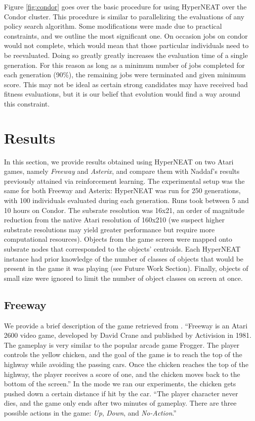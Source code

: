 \documentclass{acm_proc_article-sp}
\begin{document}
Figure \ref{fig:condor} goes over the basic procedure for using HyperNEAT over the Condor cluster. This procedure is similar to parallelizing the evaluations of any policy search algorithm. Some modifications were made due to practical constraints, and we outline the most significant one. On occasion jobs on condor would not complete, which would mean that those particular individuals need to be reevaluated. Doing so greatly greatly increases the evaluation time of a single generation. For this reason as long as a minimum number of jobs completed for each generation (90\%), the remaining jobs were terminated and given minimum score. This may not be ideal as certain strong candidates may have received bad fitness evaluations, but it is our belief that evolution would find a way around this constraint.

\section{Results}
\label{sec:results}
In this section, we provide results obtained using HyperNEAT on two Atari games, namely \textit{Freeway} and \textit{Asterix}, and compare them with Naddaf's results previously attained via reinforcement learning. The experimental setup was the same for both Freeway and Asterix: HyperNEAT was run for 250 generations, with 100 individuals evaluated during each generation. Runs took between 5 and 10 hours on Condor. The subsrate resolution was 16x21, an order of magnitude reduction from the native Atari resolution of 160x210 (we suspect higher substrate resolutions may yield greater performance but require more computational resources). Objects from the game screen were mapped onto subsrate nodes that corresponded to the objects' centroids. Each HyperNEAT instance had prior knowledge of the number of classes of objects that would be present in the game it was playing (see Future Work Section). Finally, objects of small size were ignored to limit the number of object classes on screen at once.

\subsection {Freeway}
We provide a brief description of the game retrieved from \cite{naddaf10}. ``Freeway is an Atari 2600 video game, developed by David Crane and published by Activision in 1981. The gameplay is very similar to the popular arcade game Frogger. The player controls the yellow chicken, and the goal of the game is to reach the top of the highway while avoiding the passing cars. Once the chicken reaches the top of the highway, the player receives a score of one, and the chicken moves back to the bottom of the screen.'' In the mode we ran our experiments, the chicken gets pushed down a certain distance if hit by the car. ``The player character never dies, and the game only ends after two minutes of gameplay. There are three possible actions in the game: \textit{Up}, \textit{Down}, and \textit{No-Action}.''
\end{document}
